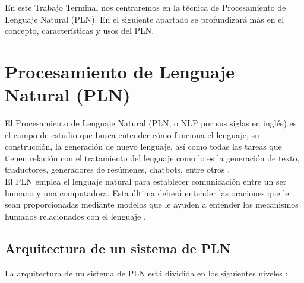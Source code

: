 En este Trabajo Terminal nos centraremos en la técnica de Procesamiento de Lenguaje Natural (PLN). En el siguiente apartado se profundizará más en el concepto, características y usos del PLN.\\

\section{Procesamiento de Lenguaje Natural (PLN)}
El Procesamiento de Lenguaje Natural (PLN, o NLP por sus siglas en inglés) es el campo de estudio que busca entender cómo funciona el lenguaje, su construcción, la generación de nuevo lenguaje, así como todas las tareas que tienen relación con el tratamiento del lenguaje como lo es la generación de texto, traductores, generadores de resúmenes, chatbots, entre otros \cite{ref45}.\\

El PLN emplea el lenguaje natural para establecer comunicación entre un ser humano y una computadora. Esta última deberá entender las oraciones que le sean proporcionadas mediante modelos que le ayuden a entender los mecanismos humanos relacionados con el lenguaje \cite{ref46}. 

\subsection{Arquitectura de un sistema de PLN}

La arquitectura de un sistema de PLN está dividida en los siguientes niveles \cite{ref47}:\

